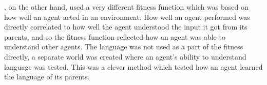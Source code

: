 \citet{munroe2002learning}, on the other hand, used a very different fitness function which was based on how well an agent acted in an environment. How well an agent performed was directly correlated to how well the agent understood the input it got from its parents, and so the fitness function reflected how an agent was able to understand other agents. The language was not used as a part of the fitness directly, a separate world was created where an agent's ability to understand language was tested. This was a clever method which tested how an agent learned the language of its parents.


